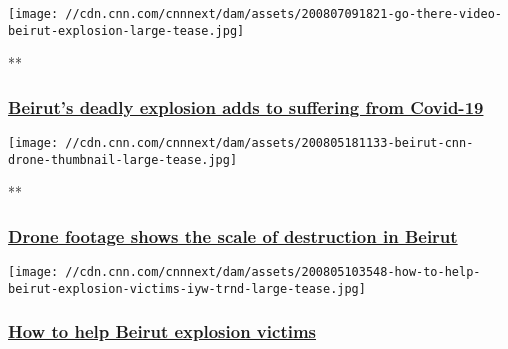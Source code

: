 \href{/videos/world/2020/08/07/beirut-explosion-amplifies-coronavirus-economic-struggles-go-there.cnn}{}

\texttt{[image: //cdn.cnn.com/cnnnext/dam/assets/200807091821-go-there-video-beirut-explosion-large-tease.jpg]}

**

\hypertarget{beiruts-deadly-explosion-adds-to-suffering-from-covid-19}{%
\subsubsection{\texorpdfstring{\href{/videos/world/2020/08/07/beirut-explosion-amplifies-coronavirus-economic-struggles-go-there.cnn}{Beirut's
deadly explosion adds to suffering from
Covid-19}}{Beirut's deadly explosion adds to suffering from Covid-19}}\label{beiruts-deadly-explosion-adds-to-suffering-from-covid-19}}

\href{/videos/world/2020/08/05/beirut-explosion-lebanon-destruction-drone-video-lon-orig-bks.cnn}{}

\texttt{[image: //cdn.cnn.com/cnnnext/dam/assets/200805181133-beirut-cnn-drone-thumbnail-large-tease.jpg]}

**

\hypertarget{drone-footage-shows-the-scale-of-destruction-in-beirut}{%
\subsubsection{\texorpdfstring{\href{/videos/world/2020/08/05/beirut-explosion-lebanon-destruction-drone-video-lon-orig-bks.cnn}{Drone
footage shows the scale of destruction in
Beirut}}{Drone footage shows the scale of destruction in Beirut}}\label{drone-footage-shows-the-scale-of-destruction-in-beirut}}

\href{/2020/08/05/world/help-beirut-explosion-victims-iyw-trnd/index.html}{}

\texttt{[image: //cdn.cnn.com/cnnnext/dam/assets/200805103548-how-to-help-beirut-explosion-victims-iyw-trnd-large-tease.jpg]}

\hypertarget{how-to-help-beirut-explosion-victims-}{%
\subsubsection{\texorpdfstring{\href{/2020/08/05/world/help-beirut-explosion-victims-iyw-trnd/index.html}{How
to help Beirut explosion victims
}}{How to help Beirut explosion victims }}\label{how-to-help-beirut-explosion-victims-}}

